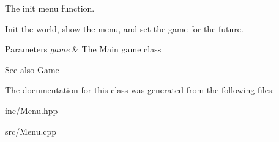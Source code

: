 The init menu function. 

Init the world, show the menu, and set the game for the future. 
\begin{DoxyParams}{Parameters}
{\em game} & The Main game class \\
\hline
\end{DoxyParams}
\begin{DoxySeeAlso}{See also}
\hyperlink{class_game}{Game} 
\end{DoxySeeAlso}


The documentation for this class was generated from the following files\+:\begin{DoxyCompactItemize}
\item 
inc/Menu.\+hpp\item 
src/Menu.\+cpp\end{DoxyCompactItemize}
